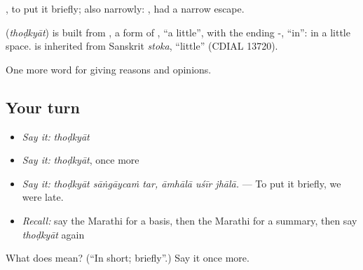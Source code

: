   , to put it briefly; also narrowly:  , had a narrow escape.

\begin{cousinweb}
\textbf{} (\emph{thoḍkyāt}) is built from , a form of , \textquotedblleft{}a little\textquotedblright{}, with the ending -, \textquotedblleft{}in\textquotedblright{}: in a little space.  is inherited from Sanskrit \emph{stoka}, \textquotedblleft{}little\textquotedblright{} (CDIAL 13720).
\end{cousinweb}

\begin{grammarlens}[title={What you've built}]
One more word for giving reasons and opinions.
\end{grammarlens}

\subsection*{Your turn}
\begin{itemize}
\raggedright
  \item \emph{Say it:} \emph{thoḍkyāt}
  \item \emph{Say it:} \emph{thoḍkyāt}, once more
  \item \emph{Say it:} \emph{thoḍkyāt sāṅgāycaṁ tar, āmhālā uśīr jhālā.} — To put it briefly, we were late.
  \item \emph{Recall:} say the Marathi for a basis, then the Marathi for a summary, then say \emph{thoḍkyāt} again
\end{itemize}

\begin{tcolorbox}[breakable,colback=teal!4,colframe=teal!35!black,title={Before you move on}]
What does  mean? (\textquotedblleft{}In short; briefly\textquotedblright{}.) Say it once more.
\end{tcolorbox}
